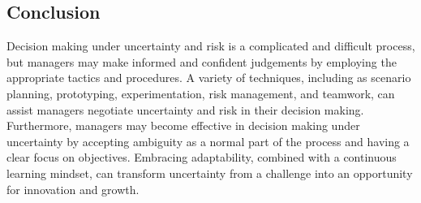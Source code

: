 \documentclass{article}
\begin{document}
\subsection{Conclusion}
Decision making under uncertainty and risk is a complicated and difficult process, but managers may make informed and confident judgements by employing the appropriate tactics and procedures. A variety of techniques, including as scenario planning, prototyping, experimentation, risk management, and teamwork, can assist managers negotiate uncertainty and risk in their decision making. Furthermore, managers may become effective in decision making under uncertainty by accepting ambiguity as a normal part of the process and having a clear focus on objectives. 
Embracing  adaptability, combined with a continuous learning mindset, can transform uncertainty from a challenge into an opportunity for innovation and growth.

\end{document}
